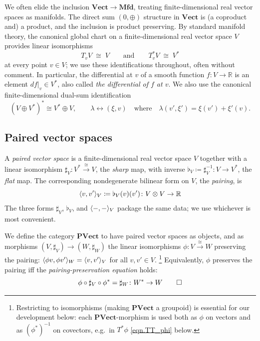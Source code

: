 \documentclass[11pt, oneside, article]{memoir}
\theoremstyle{definition}
\theoremstyle{plain}
\newenvironment{definition}
  {\pushQED{\qed}\renewcommand{\qedsymbol}{$\lozenge$}\definitionx}
  {\popQED\enddefinitionx}
\DeclarePairedDelimiter{\pairing}{\langle}{\rangle}
\newcommand{\Cat}[1]{\mathbf{#1}}%
\newcommand{\To}[2][]{\xrightarrow[#1]{#2}}
\newcommand{\inv}{^{-1}}
\newcommand{\rr}{\mathbb{R}}
\newcommand{\vect}{\Cat{Vect}}
\newcommand{\qqand}{\qquad\text{and}\qquad}
\newcommand{\mfd}{\Cat{Mfd}}
\newcommand{\pvect}{\Cat{PVect}}
\begin{document}
We often elide the inclusion $\vect\to\mfd$, treating finite-dimensional real vector spaces as manifolds. The direct sum $(0,\oplus)$ structure in $\vect$ is (a coproduct and) a product, and the inclusion is product preserving. By standard manifold theory, the canonical global chart on a finite-dimensional real vector space $V$ provides linear isomorphisms
\begin{equation}\label{eqn.tangent_vec}
T_vV \;\cong\; V \qqand T^*_vV \;\cong\; V^*
\end{equation}
at every point $v\in V$; we use these identifications throughout, often without comment. In particular, the differential at $v$ of a smooth function $f\colon V\to\rr$ is an element $df|_v\in V^*$, also called \emph{the differential of $f$ at $v$}.
We also use the canonical finite-dimensional dual-sum identification
\begin{equation}\label{eqn.canonical_dual_sum}
(V\oplus V^*)^*\cong V^*\oplus V,\qquad
\lambda\leftrightarrow(\xi,v)\quad\text{where}\quad
\lambda(v',\xi')=\xi(v')+\xi'(v).
\end{equation}

\subsection{Paired vector spaces}\label{sec.pnla}

\begin{definition}\label{def.pnla}
A \emph{paired vector space} is a finite-dimensional real vector space $V$ together with a linear isomorphism $\sharp_V\colon V^*\To{\cong}V$, the \emph{sharp} map, with inverse $\flat_V\coloneqq\sharp_V\inv\colon V\to V^*$, the \emph{flat} map. The corresponding nondegenerate bilinear form on $V$, the \emph{pairing}, is
\begin{equation}\label{eqn.pairing}
\pairing{v,v'}_V\coloneqq\flat_V(v)(v')\colon V\otimes V\to\rr
\end{equation}
The three forms $\sharp_V$, $\flat_V$, and $\pairing{-,-}_V$ package the same data; we use whichever is most convenient.

We define the category $\pvect$ to have paired vector spaces as objects, and as morphisms $(V,\sharp_V)\to(W,\sharp_W)$ the linear isomorphisms $\phi\colon V\To{\cong}W$ preserving the pairing: $\pairing{\phi v,\phi v'}_W=\pairing{v,v'}_V$ for all $v,v'\in V$.%
\footnote{
Restricting to isomorphisms (making $\pvect$ a groupoid) is essential for our development below: each $\pvect$-morphism is used both as $\phi$ on vectors and as $(\phi^*)\inv$ on covectors, e.g.\ in $T^*\phi$ \eqref{eqn.TT_phi} below.
}
Equivalently, $\phi$ preserves the pairing iff the \emph{pairing-preservation equation} holds:
\begin{equation}\label{eqn.pairing_triangle}
\phi\circ\sharp_V\circ\phi^*=\sharp_W\colon W^*\to W
\qedhere
\end{equation}
\end{definition}
\end{document}
